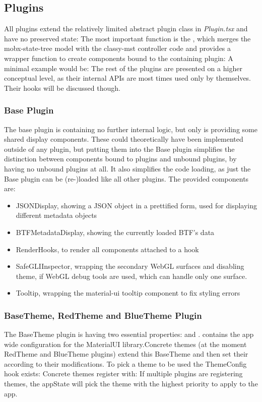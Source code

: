 \subsection{Plugins}\label{sec_plugins}
All plugins extend the relatively limited abstract plugin class in
\emph{Plugin.tsx} and have no preserved state:
The most important function is the , which merges the
mobx-state-tree model with the classy-mst controller code and provides a wrapper
function to create components bound to the containing plugin:
A minimal example would be:
The rest of the plugins are presented on a higher conceptual level, as their
internal APIs are most times used only by themselves. Their hooks will be
discussed though.

\subsubsection{Base Plugin}
The base plugin is containing no further internal logic, but only is providing
some shared display components. These could theoretically have been implemented
outside of any plugin, but putting them into the Base plugin simplifies the
distinction between components bound to plugins and unbound plugins, by having
no unbound plugins at all. It also simplifies the code loading, as just the Base
plugin can be (re-)loaded like all other plugins. The provided components are:
\begin{itemize}
\item JSONDisplay, showing a JSON object in a prettified form, used for
  displaying different metadata objects
\item BTFMetadataDisplay, showing the currently loaded BTF's data
\item RenderHooks, to render all components attached to a hook
\item SafeGLIInspector, wrapping the secondary WebGL surfaces and disabling
    theme, if WebGL debug tools are used, which can handle only one surface.
\item Tooltip, wrapping the material-ui tooltip component to fix styling errors
\end{itemize}

\subsubsection{BaseTheme, RedTheme and BlueTheme Plugin}
The BaseTheme plugin is having two essential properties:
 and .  contains the app
wide configuration for the MaterialUI library.Concrete themes (at the moment RedTheme and BlueTheme plugins) extend this
BaseTheme and then set their  according to their
modifications. To pick a theme to be used the ThemeConfig hook exists:
Concrete themes register with:
If multiple plugins are registering themes, the appState will pick the theme
with the highest priority to apply to the app.

